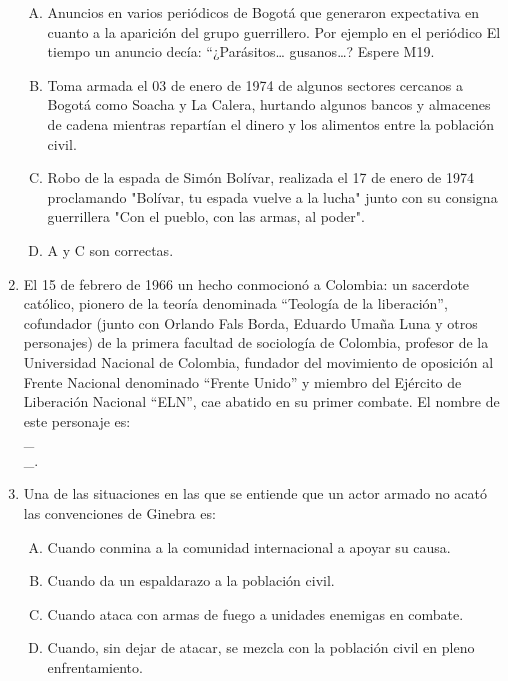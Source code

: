 \begin{enumerate}
\begin{enumerate}[(A)]
\item   Anuncios en varios periódicos de Bogotá que generaron expectativa en cuanto a la aparición del grupo guerrillero. Por ejemplo en el periódico El tiempo un anuncio decía: ``¿Parásitos… gusanos…? Espere M19.   
 \item  Toma armada el 03 de enero de 1974 de algunos sectores cercanos a Bogotá como Soacha y La Calera, hurtando algunos bancos y almacenes de cadena mientras repartían el dinero y los alimentos entre la población civil.
\item Robo de la espada de Simón Bolívar, realizada el 17 de enero de 1974 proclamando "Bolívar, tu espada vuelve a la lucha" junto con su consigna guerrillera "Con el pueblo, con las armas, al poder".
\item A y C son correctas.
\end{enumerate}


\newpage
\item  El 15 de febrero de 1966 un hecho conmocionó a Colombia: un sacerdote católico, pionero de la teoría denominada ``Teología de la liberación'', cofundador (junto con Orlando Fals Borda, Eduardo Umaña Luna y otros personajes) de la primera facultad de sociología de Colombia, profesor de la Universidad Nacional de Colombia, fundador del movimiento de oposición al Frente Nacional denominado ``Frente Unido'' y miembro del Ejército de Liberación Nacional ``ELN'', cae abatido en su primer combate. El nombre de este personaje es:\label{sociii-11}
\hrulefill\\
\_\hrulefill\\
\_\hrulefill.





\item Una de las situaciones en las que se entiende que un actor armado no acató las convenciones de Ginebra es:\label{sociii-14}
\begin{enumerate}[(A)]
\item   Cuando conmina a la comunidad internacional a apoyar su causa.
 \item  Cuando da un espaldarazo a la población civil.
\item Cuando ataca con armas de fuego a unidades enemigas en combate.
\item Cuando, sin dejar de atacar, se mezcla con la población civil en pleno enfrentamiento.
\end{enumerate}



\end{enumerate}
